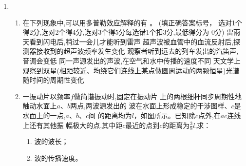 \begin{enumerate}
\begin{enumerate}
\end{enumerate}







\newpage
{}


\item 
\begin{enumerate}
\item
在下列现象中,可以用多普勒效应解释的有 \underlinegap 。
(填正确答案标号，
选对1个得2分,选对2个得4分,选对3个得5分每选错1个扣3分,最低得分为
0分)
\fivechoices
{雷雨天看到闪电后,稍过一会儿才能听到雷声}
{超声波被血管中的血流反射后,探测器接收到的超声波频率发生变化}
{观察者听到远去的列车发出的汽笛声,音调会变低}
{同一声源发出的声波,在空气和水中传播的速度不同}
{天文学上观察到双星(相距较近、均绕它们连线上某点做圆周运动的两颗恒星)光谱随时间的周期性变化}




\item 
一振动片以频率$ f $做简谐振动时,固定在振动片
上的两根细杆同步周期性地触动水面上$ a $、$ b $两点,两波源发出的
波在水面上形成稳定的干涉图样、$ c $是水面上的一点,$ a $、$ b $、$ c $间
的距离均为$ l $，如图所示。已知除$ c $点外,在$ ac $连线上还有其他振
幅极大的点,其中距$ c $最近的点到$ c $的距离为$ \frac{ 3 }{ 8 } l $,求：
\begin{enumerate}
\item
波的波长；

\item 
波的传播速度。

\end{enumerate}
\begin{figure}[h!]
\flushright

\end{figure}





\end{enumerate}




\end{enumerate}



